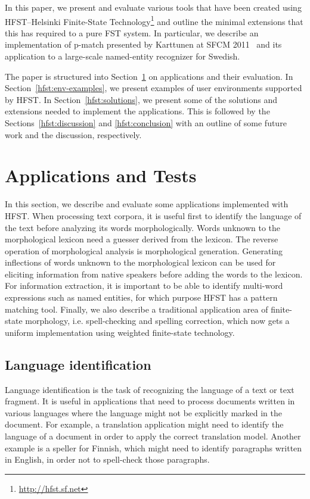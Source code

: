 \documentclass{llncs}
\begin{document}
In this paper, we present and evaluate various tools that have been created using HFST--Helsinki Finite-State Technology\footnote{\url{http://hfst.sf.net}} and outline the minimal extensions that this has required to a pure FST system. In particular, we describe an implementation of p-match presented by Karttunen at SFCM 2011~\cite{karttunen/2011} and its application to a large-scale named-entity recognizer for Swedish.

The paper is structured into Section~\ref{hfst:structural-layout} on applications and their evaluation. In Section~\ref{hfst:env-examples}, we present examples of user environments supported by HFST. In Section~\ref{hfst:solutions}, we present some of the solutions and extensions needed to implement the applications. This is followed by the Sections~\ref{hfst:discussion} and \ref{hfst:conclusion} with an outline of some future work and the discussion, respectively.

\section{Applications and Tests}\label{hfst:structural-layout}
In this section, we describe and evaluate some applications implemented with HFST. When processing text corpora, it is useful first to identify the language of the text before analyzing its words morphologically. Words unknown to the morphological lexicon need a guesser derived from the lexicon. The reverse operation of morphological analysis is morphological generation. Generating inflections of words unknown to the morphological lexicon can be used for eliciting information from native speakers before adding the words to the lexicon. For information extraction, it is important to be able to identify multi-word expressions such as named entities, for which purpose HFST has a pattern matching tool. Finally, we also describe a traditional application area of finite-state morphology, i.e. spell-checking and spelling correction, which now gets a uniform implementation using weighted finite-state technology. 

\subsection{Language identification}
Language identification is the task of recognizing the language of a
text or text fragment. It is useful in applications that need to
process documents written in various languages where the language
might not be explicitly marked in the document. For example, a translation
application might need to identify the language of a document in order
to apply the correct translation model. Another example is a speller
for Finnish, which might need to identify paragraphs written in
English, in order not to spell-check those paragraphs.
\end{document}
